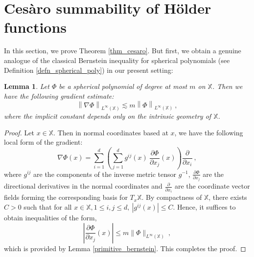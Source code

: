 \documentclass[12pt]{amsart}
\newtheorem{lemma}[theorem]{Lemma}
\theoremstyle{definition}
\newcommand{\X}{\mathbb X}%
\numberwithin{equation}{section}
\begin{document}
\section{Ces\`aro summability of H\"older functions}
\label{sec3}
In this section, we prove Theorem \ref{thm_cesaro}. But first, we obtain a genuine analogue of the classical Bernstein inequality for spherical polynomials (see Definition \ref{defn_spherical_poly}) in our present setting:
\begin{lemma} \label{bernstein}
Let $\Phi$ be a spherical polynomial of degree at most $m$ on $\X$. Then we have the following gradient estimate:
\begin{equation*}
\left\|\nabla \Phi\right\|_{L^\infty(\X)} \lesssim m \left\|\Phi\right\|_{L^\infty(\X)}\:,
\end{equation*} 
where the implicit constant depends only on the intrinsic geometry of $\X$.
\end{lemma}
\begin{proof}
Let $x \in \X$. Then in normal coordinates based at $x$, we have the following local form of the gradient:
\begin{equation*} 
\nabla \Phi(x)=\sum_{i=1}^d \left(\sum_{j=1}^d g^{ij}(x)\:\frac{\partial \Phi}{\partial x_j}(x)\right)\frac{\partial}{\partial x_i}\:,
\end{equation*}
where $g^{ij}$ are the components of the inverse metric tensor $g^{-1}$, $\frac{\partial \Phi}{\partial x_j}$ are the directional derivatives in the normal coordinates and $\frac{\partial}{\partial x_i}$ are the coordinate vector fields forming the corresponding basis for $T_x\X$. By compactness of $\X$, there exists $C>0$ such that for all $x \in \X, 1 \le i,j \le d, \:\left|g^{ij}(x)\right| \le C.$ Hence, it suffices to obtain inequalities of the form,
\begin{equation*}
\left|\frac{\partial \Phi}{\partial x_j}(x)\right| \le m \|\Phi\|_{L^\infty(\X)}\:, 
\end{equation*}
which is provided by Lemma \ref{primitive_bernstein}. This completes the proof.
\end{proof}
\end{document}
